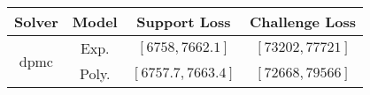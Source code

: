 \begin{tabular}{cc|c|c} 
\hline 
 Solver & Model & Support Loss  & Challenge Loss \tabularnewline\hline 
\hline 
\multirow{2}{*}{dpmc} & Exp. & $\left[6758,7662.1\right]$ & $\left[73202,77721\right]$ \tabularnewline 
 & Poly. & $\left[6757.7,7663.4\right]$ & $\left[72668,79566\right]$ \tabularnewline 
\hline 
\end{tabular} 

